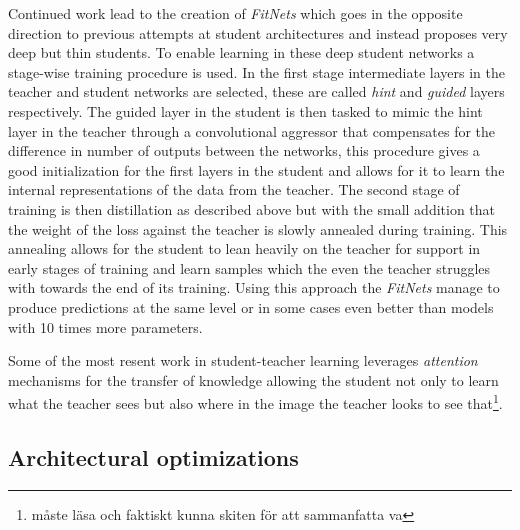 \documentclass[11pt]{article}
\newcommand{\bibentry}[1]{\cite{#1}}
\begin{document}
Continued work lead to the creation of \emph{FitNets}\bibentry{romero2014fitnets} which goes in the opposite direction to previous attempts at student architectures and instead proposes very deep but thin students. To enable learning in these deep student networks a stage-wise training procedure is used. In the first stage intermediate layers in the teacher and student networks are selected, these are called \emph{hint} and \emph{guided} layers respectively. The guided layer in the student is then tasked to mimic the hint layer in the teacher through a convolutional aggressor that compensates for the difference in number of outputs between the networks, this procedure gives a good initialization for the first layers in the student and allows for it to learn the internal representations of the data from the teacher. The second stage of training is then distillation as described above but with the small addition that the weight of the loss against the teacher is slowly annealed during training. This annealing allows for the student to lean heavily on the teacher for support in early stages of training and learn samples which the even the teacher struggles with towards the end of its training. Using this approach the \emph{FitNets} manage to produce predictions at the same level or in some cases even better than models with 10 times more parameters.

Some of the most resent work in student-teacher learning leverages \emph{attention} mechanisms for the transfer of knowledge allowing the student not only to learn what the teacher sees but also where in the image the teacher looks to see that\bibentry{zagouruyko2017paying}\footnote{måste läsa och faktiskt kunna skiten för att sammanfatta va}. 

\subsection*{Architectural optimizations}
\label{sec:orgc3b24b0}

 
\end{document}
